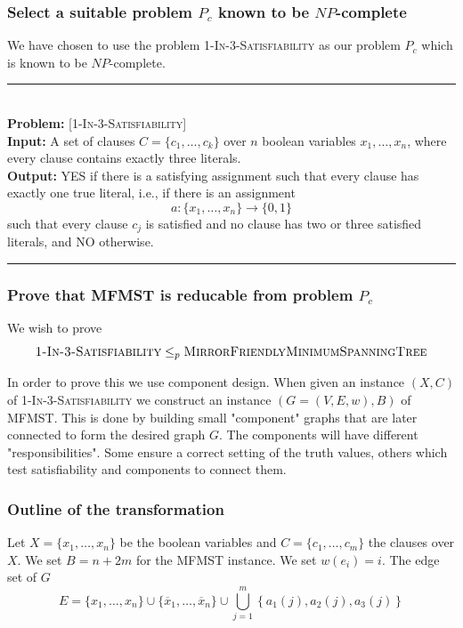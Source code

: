 \documentclass[12pt]{report}
\newcommand{\HRule}{\rule{\linewidth}{0.075mm}}
\begin{document}
\subsubsection{Select a suitable problem $P_c$ known to be $NP$-complete}
We have chosen to use the problem \textsc{1-In-3-Satisfiability} as our problem $P_c$ which is known to be $NP$-complete.\\
\HRule\\
\textbf{Problem:} \textsc{[1-In-3-Satisfiability]}\\
\textbf{Input:} A set of clauses $C = \{c_1,\dots,c_k\}$ over $n$ boolean variables $x_1,\dots,x_n$, where every clause contains exactly three literals.\\
\textbf{Output:} YES if there is a satisfying assignment such that every clause has exactly one true literal, i.e., if there is an assignment
$$a: \{x_1,\dots,x_n\} \rightarrow \{0,1\}$$
such that every clause $c_j$ is satisfied and no clause has two or three satisfied literals, and NO otherwise.\\
\HRule

\subsubsection{Prove that MFMST is reducable from problem $P_c$}
We wish to prove $$\textsc{1-In-3-Satisfiability} \leq_p \textsc{MirrorFriendlyMinimumSpanningTree}$$

In order to prove this we use component design. When given an instance $(X,C)$ of \textsc{1-In-3-Satisfiability} we construct an instance $(G = (V, E,w),B)$ of MFMST. This is done by building small "component" graphs that are later connected to form the desired graph $G$. The components will have different "responsibilities". Some ensure a correct setting of the truth values, others which test satisfiability and components to connect them.

\subsubsection{Outline of the transformation}
Let $X = \{x_1,\dots,x_n\}$ be the boolean variables and $C = \{c_1,\dots,c_m\}$ the clauses over $X$. We set $B = n + 2m$ for the MFMST instance. We set $w(e_i) = i$. The edge set of $G$
$$E = \{x_1,\dots,x_n\} \cup \{\overline{x}_1,\dots,\overline{x}_n\} \cup \bigcup_{j=1}^{m}{\left\{a_1(j),a_2(j),a_3(j)\right\}}$$
\end{document}
